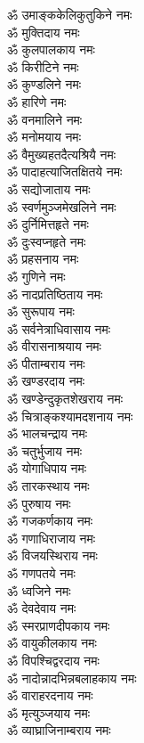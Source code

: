 \begin{multicols}{2}
\begin{flushleft}
ॐ उमाङ्ककेलिकुतुकिने नमः\\
ॐ मुक्तिदाय नमः\\
ॐ कुलपालकाय नमः\\
ॐ किरीटिने नमः\\
ॐ कुण्डलिने नमः\\
ॐ हारिणे नमः\hfill{}\\
ॐ वनमालिने नमः\\
ॐ मनोमयाय नमः\\
ॐ वैमुख्यहतदैत्यश्रियै नमः\\
ॐ पादाहत्याजितक्षितये नमः\\
ॐ सद्योजाताय नमः\\
ॐ स्वर्णमुञ्जमेखलिने नमः\\
ॐ दुर्निमित्तहृते नमः\\
ॐ दुःस्वप्नहृते नमः\\
ॐ प्रहसनाय नमः\\
ॐ गुणिने नमः\hfill{}\\
ॐ नादप्रतिष्ठिताय नमः\\
ॐ सुरूपाय नमः\\
ॐ सर्वनेत्राधिवासाय नमः\\
ॐ वीरासनाश्रयाय नमः\\
ॐ पीताम्बराय नमः\\
ॐ खण्डरदाय नमः\\
ॐ खण्डेन्दुकृतशेखराय नमः\\
ॐ चित्राङ्कश्यामदशनाय नमः\\
ॐ भालचन्द्राय नमः\\
ॐ चतुर्भुजाय नमः\hfill{}\\
ॐ योगाधिपाय नमः\\
ॐ तारकस्थाय नमः\\
ॐ पुरुषाय नमः\\
ॐ गजकर्णकाय नमः\\
ॐ गणाधिराजाय नमः\\
ॐ विजयस्थिराय नमः\\
ॐ गणपतये नमः\\
ॐ ध्वजिने नमः\\
ॐ देवदेवाय नमः\\
ॐ स्मरप्राणदीपकाय नमः\hfill{}\\
ॐ वायुकीलकाय नमः\\
ॐ विपश्चिद्वरदाय नमः\\
ॐ नादोन्नादभिन्नबलाहकाय नमः\\
ॐ वाराहरदनाय नमः\\
ॐ मृत्युञ्जयाय नमः\\
ॐ व्याघ्राजिनाम्बराय नमः\\

\end{flushleft}
\end{multicols}
